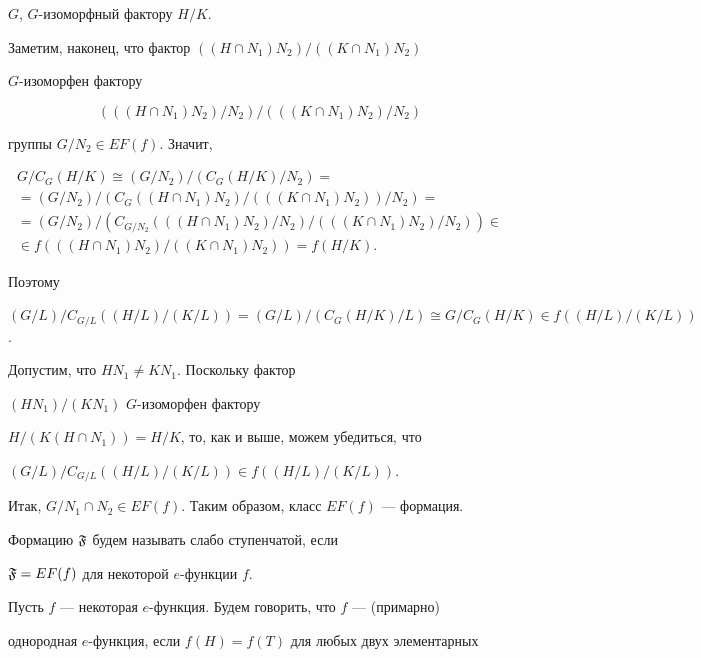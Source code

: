 \begin{pf}
$G$, $G$-изоморфный фактору $H/K$.


Заметим, наконец, что фактор $((H\cap N_1)N_2)/((K\cap N_1)N_2)$


$G$-изоморфен фактору


$$


(((H\cap N_1)N_2)/N_2)/(((K\cap N_1)N_2)/N_2)


$$


группы $G/N_2\in EF(f)$. Значит,


\begin{gather*}


G/C_G(H/K)\cong(G/N_2)/(C_G(H/K)/N_2)=\\


=(G/N_2)/(C_G((H\cap N_1)N_2)/(((K\cap N_1)N_2))/N_2)=\\


=(G/N_2)/(C_{G/N_2}(((H\cap N_1)N_2)/N_2)/(((K\cap N_1)N_2)/N_2))\in \\


\in f(((H\cap N_1)N_2)/((K\cap N_1)N_2))=f(H/K).


\end{gather*}


Поэтому


$(G/L)/C_{G/L}((H/L)/(K/L))=


(G/L)/(C_G(H/K)/L)\cong G/C_G(H/K)\in f((H/L)/(K/L))$.





Допустим, что $HN_1\ne KN_1$. Поскольку фактор


$(HN_1)/(KN_1)$\; $G$-изоморфен фактору\linebreak


$H/(K(H\cap N_1))=H/K$, то, как и выше, можем убедиться, что


$(G/L)/C_{G/L}((H/L)/(K/L))\in f((H/L)/(K/L))$.


Итак, $G/N_1\cap N_2\in EF(f)$. Таким образом, класс $EF(f)$ --- формация.


\end{pf}





Формацию $\frak{F}$ будем называть слабо ступенчатой, если


$\frak{F}=EF(f)$ для некоторой $e$-функции $f$.


Пусть $f$ --- некоторая $e$-функция. Будем говорить, что $f$ --- (примарно)


однородная $e$-функция, если $f(H)=f(T)$ для любых двух элементарных


